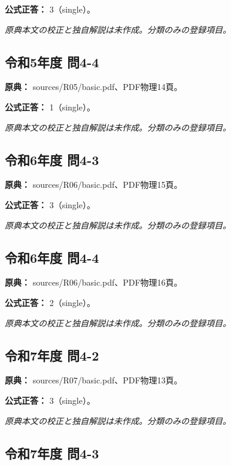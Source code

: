 \textbf{公式正答：} 3（single）。

\par\textit{原典本文の校正と独自解説は未作成。分類のみの登録項目。}

\subsection{令和5年度 問4-4}
\label{q:r05-reg-basic-4-4}

\noindent\textbf{原典：} sources/R05/basic.pdf、PDF物理14頁。

\textbf{公式正答：} 1（single）。

\par\textit{原典本文の校正と独自解説は未作成。分類のみの登録項目。}

\subsection{令和6年度 問4-3}
\label{q:r06-reg-basic-4-3}

\noindent\textbf{原典：} sources/R06/basic.pdf、PDF物理15頁。

\textbf{公式正答：} 3（single）。

\par\textit{原典本文の校正と独自解説は未作成。分類のみの登録項目。}

\subsection{令和6年度 問4-4}
\label{q:r06-reg-basic-4-4}

\noindent\textbf{原典：} sources/R06/basic.pdf、PDF物理16頁。

\textbf{公式正答：} 2（single）。

\par\textit{原典本文の校正と独自解説は未作成。分類のみの登録項目。}

\subsection{令和7年度 問4-2}
\label{q:r07-reg-basic-4-2}

\noindent\textbf{原典：} sources/R07/basic.pdf、PDF物理13頁。

\textbf{公式正答：} 3（single）。

\par\textit{原典本文の校正と独自解説は未作成。分類のみの登録項目。}

\subsection{令和7年度 問4-3}
\label{q:r07-reg-basic-4-3}

